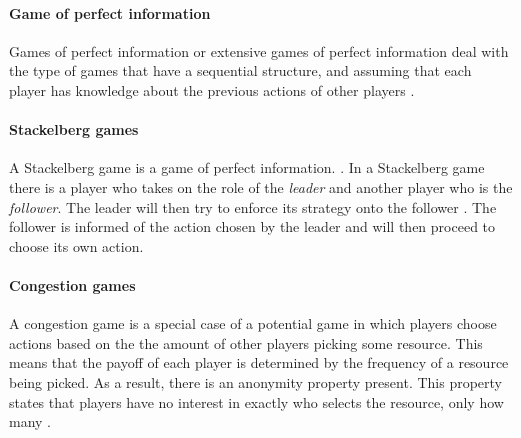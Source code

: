 \paragraph{Game of perfect information}
Games of perfect information or extensive games of perfect information deal with the type of games that have a sequential structure, and assuming that each player has knowledge about the previous actions of other players \cite{CourseInGameTheory}.

\paragraph{Stackelberg games}
A Stackelberg game is a game of perfect information. \cite{CourseInGameTheory}.
In a Stackelberg game there is a player who takes on the role of the \textit{leader} and another player who is the \textit{follower}. The leader will then try to enforce its strategy onto the follower \cite{ShohamLeyton-Brown2008}. The follower is informed of the action chosen by the leader and will then proceed to choose its own action.

\paragraph{Congestion games}
A congestion game is a special case of a potential game \cite{IbarsNavarroGiupponi2010, MondererShapley1996, ShohamLeyton-Brown2008} in which players choose actions based on the the amount of other players picking some resource. This means that the payoff of each player is determined by the frequency of a resource being picked. As a result, there is an anonymity property present. This property states that players have no interest in exactly who selects the resource, only how many \cite{ShohamLeyton-Brown2008}.